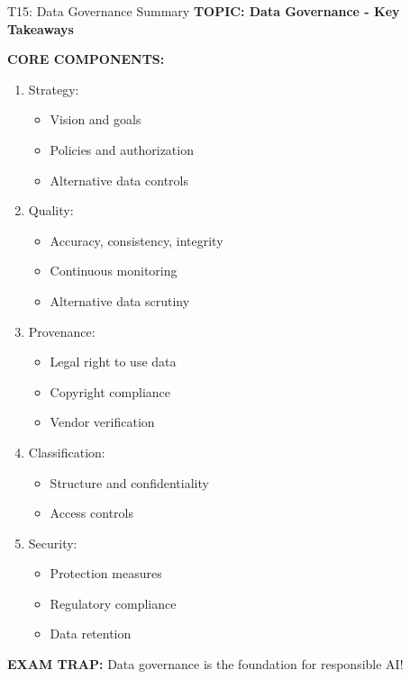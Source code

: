 \documentclass[8pt]{beamer}
\begin{document}
	\begin{frame}{T15: Data Governance Summary}
		\fontsize{6.5}{7.5}\selectfont
		\textbf{TOPIC: Data Governance - Key Takeaways}
		
		\vspace{0.1cm}
		\textbf{CORE COMPONENTS:}
		\begin{enumerate}
			\item \textcolor{myblue}{Strategy:}
			\begin{itemize}
				\item Vision and goals
				\item Policies and authorization
				\item Alternative data controls
			\end{itemize}
			\item \textcolor{myblue}{Quality:}
			\begin{itemize}
				\item Accuracy, consistency, integrity
				\item Continuous monitoring
				\item Alternative data scrutiny
			\end{itemize}
			\item \textcolor{myblue}{Provenance:}
			\begin{itemize}
				\item Legal right to use data
				\item Copyright compliance
				\item Vendor verification
			\end{itemize}
			\item \textcolor{myblue}{Classification:}
			\begin{itemize}
				\item Structure and confidentiality
				\item Access controls
			\end{itemize}
			\item \textcolor{myblue}{Security:}
			\begin{itemize}
				\item Protection measures
				\item Regulatory compliance
				\item Data retention
			\end{itemize}
		\end{enumerate}
		
		\textcolor{myred}{\textbf{EXAM TRAP:}} Data governance is the \textcolor{myblue}{foundation for responsible AI}!
	\end{frame}
	
\end{document}
